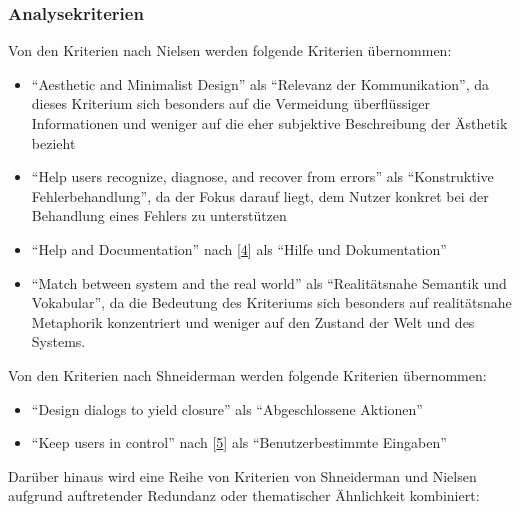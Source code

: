\documentclass[
  12pt,
  ngerman,
  a4paper,
]{article}
\providecommand{\tightlist}{%
  \setlength{\itemsep}{0pt}\setlength{\parskip}{0pt}}
\begin{document}
\hypertarget{analysekriterien}{%
\subsubsection{Analysekriterien}\label{analysekriterien}}

Von den Kriterien nach Nielsen werden folgende Kriterien übernommen:

\begin{itemize}
\item
  ``Aesthetic and Minimalist Design'' als ``Relevanz der
  Kommunikation'', da dieses Kriterium sich besonders auf die Vermeidung
  überflüssiger Informationen und weniger auf die eher subjektive
  Beschreibung der Ästhetik bezieht
\item
  ``Help users recognize, diagnose, and recover from errors'' als
  ``Konstruktive Fehlerbehandlung'', da der Fokus darauf liegt, dem
  Nutzer konkret bei der Behandlung eines Fehlers zu unterstützen
\item
  ``Help and Documentation'' nach
  {[}\protect\hyperlink{ref-heur:brauux2fsarodnick}{4}{]} als ``Hilfe
  und Dokumentation''
\item
  ``Match between system and the real world'' als ``Realitätsnahe
  Semantik und Vokabular'', da die Bedeutung des Kriteriums sich
  besonders auf realitätsnahe Metaphorik konzentriert und weniger auf
  den Zustand der Welt und des Systems.
\end{itemize}

Von den Kriterien nach Shneiderman werden folgende Kriterien übernommen:

\begin{itemize}
\tightlist
\item
  ``Design dialogs to yield closure'' als ``Abgeschlossene Aktionen''
\item
  ``Keep users in control'' nach
  {[}\protect\hyperlink{ref-heur:dahm}{5}{]} als ``Benutzerbestimmte
  Eingaben''
\end{itemize}

Darüber hinaus wird eine Reihe von Kriterien von Shneiderman und Nielsen
aufgrund auftretender Redundanz oder thematischer Ähnlichkeit
kombiniert:
\end{document}
